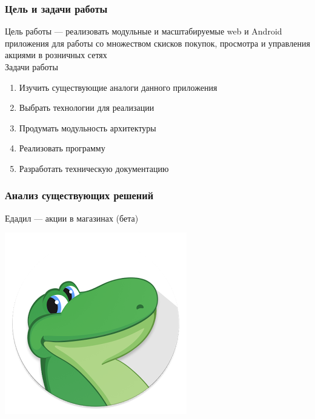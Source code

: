 \documentclass{beamer}
\begin{document}
\begin{frame}
    \frametitle{Цель и задачи работы}
    Цель работы --- реализовать модульные и масштабируемые web и Android
    приложения для работы со множеством скисков покупок, просмотра и управления
    акциями в розничных сетях\\
    \bigskip
    Задачи работы
    \begin{enumerate}
        \item Изучить существующие аналоги данного приложения
        \item Выбрать технологии для реализации
        \item Продумать модульность архитектуры
        \item Реализовать программу
        \item Разработать техническую документацию
    \end{enumerate}
\end{frame}

\begin{frame}
\frametitle{Анализ существующих решений}
    Едадил — акции в магазинах (бета)
        \medskip
        \begin{center}
        \includegraphics[width=0.5\columnwidth]{edadeal.png}
        \end{center}
\end{frame}
\end{document}
